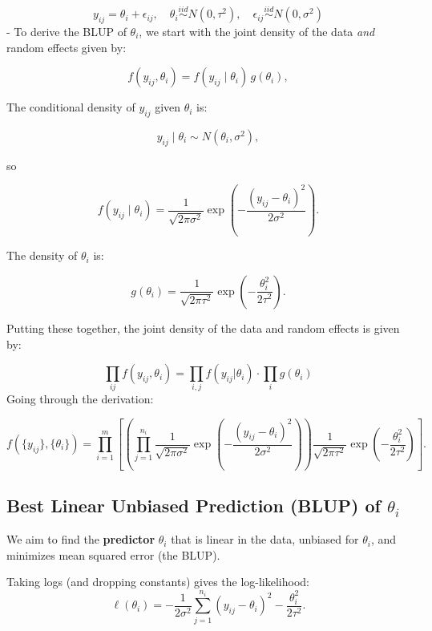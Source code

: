 \documentclass[
  letterpaper,
  DIV=11,
  numbers=noendperiod]{scrreprt}
\begin{document}
\[
y_{ij} = \theta_i + \epsilon_{ij}, \quad \theta_i \overset{iid}{\sim} N(0, \tau^2), \quad \epsilon_{ij} \overset{iid}{\sim} N(0, \sigma^2)
\] - To derive the BLUP of \(\theta_i\), we start with the joint density
of the data \emph{and} random effects given by:

\[
f(y_{ij}, \theta_i) = f(y_{ij} \mid \theta_i) \, g(\theta_i),
\]

The conditional density of \(y_{ij}\) given \(\theta_i\) is:

\[
y_{ij} \mid \theta_i \sim N(\theta_i, \sigma^2),
\]

so

\[
f(y_{ij} \mid \theta_i) = \frac{1}{\sqrt{2 \pi \sigma^2}} 
\exp \left( -\frac{(y_{ij} - \theta_i)^2}{2 \sigma^2} \right).
\]

The density of \(\theta_i\) is:

\[
g(\theta_i) = \frac{1}{\sqrt{2 \pi \tau^2}}
\exp \left( - \frac{\theta_i^2}{2 \tau^2} \right).
\]

Putting these together, the joint density of the data and random effects
is given by:

\[
\prod_{ij} f(y_{ij}, \theta_i) = \prod_{i,j} f(y_{ij}|\theta_i) \cdot \prod_i g(\theta_i)
\] Going through the derivation:

\[
f(\{y_{ij}\}, \{\theta_i\}) 
= \prod_{i=1}^m \left[ \left( \prod_{j=1}^{n_i} 
\frac{1}{\sqrt{2 \pi \sigma^2}} 
\exp \left( -\frac{(y_{ij} - \theta_i)^2}{2 \sigma^2} \right) \right) 
\frac{1}{\sqrt{2 \pi \tau^2}} 
\exp \left( - \frac{\theta_i^2}{2 \tau^2} \right) \right].
\]

\hypertarget{best-linear-unbiased-prediction-blup-of-theta_i}{%
\subsection*{\texorpdfstring{Best Linear Unbiased Prediction (BLUP) of
\(\theta_i\)}{Best Linear Unbiased Prediction (BLUP) of \textbackslash theta\_i}}\label{best-linear-unbiased-prediction-blup-of-theta_i}}

We aim to find the \textbf{predictor} \(\hat{\theta}_i\) that is linear
in the data, unbiased for \(\theta_i\), and minimizes mean squared error
(the BLUP).

Taking logs (and dropping constants) gives the log-likelihood: \[
\ell(\theta_i) 
= -\frac{1}{2\sigma^2} \sum_{j=1}^{n_i} (y_{ij} - \theta_i)^2 
- \frac{\theta_i^2}{2 \tau^2}.
\]
\end{document}
